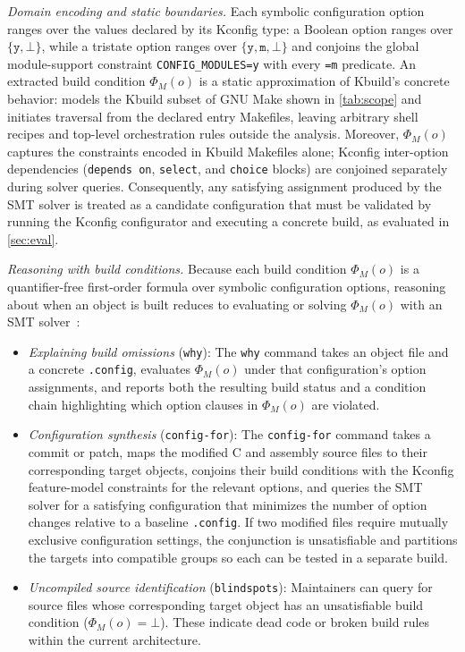 \documentclass[acmsmall,screen,review,anonymous,nonacm]{acmart}
\begin{document}
  \emph{Domain encoding and static boundaries.}
  Each symbolic configuration option ranges over the values declared by its Kconfig type: a Boolean option ranges over $\{\mathtt{y}, \bot\}$, while a tristate option ranges over $\{\mathtt{y}, \mathtt{m}, \bot\}$ and conjoins the global module-support constraint \texttt{CONFIG\_MODULES=y} with every \texttt{=m} predicate.
  An extracted build condition $\Phi_M(o)$ is a static approximation of Kbuild's concrete behavior: \tool{} models the Kbuild subset of GNU Make shown in \autoref{tab:scope} and initiates traversal from the declared entry Makefiles, leaving arbitrary shell recipes and top-level orchestration rules outside the analysis.
  Moreover, $\Phi_M(o)$ captures the constraints encoded in Kbuild Makefiles alone; Kconfig inter-option dependencies (\texttt{depends on}, \texttt{select}, and \texttt{choice} blocks) are conjoined separately during solver queries.
  Consequently, any satisfying assignment produced by the SMT solver is treated as a candidate configuration that must be validated by running the Kconfig configurator and executing a concrete build, as evaluated in \autoref{sec:eval}.

  \emph{Reasoning with build conditions.}
  Because each build condition $\Phi_M(o)$ is a quantifier-free first-order formula over symbolic configuration options, reasoning about when an object is built reduces to evaluating or solving $\Phi_M(o)$ with an SMT solver~\cite{nguyen2020kbuild}:
  \begin{itemize}[leftmargin=1.5em]
    \item \emph{Explaining build omissions} (\texttt{why}): The \texttt{why} command takes an object file and a concrete \texttt{.config}, evaluates $\Phi_M(o)$ under that configuration's option assignments, and reports both the resulting build status and a condition chain highlighting which option clauses in $\Phi_M(o)$ are violated.
    \item \emph{Configuration synthesis} (\texttt{config-for}): The \texttt{config-for} command takes a commit or patch, maps the modified C and assembly source files to their corresponding target objects, conjoins their build conditions with the Kconfig feature-model constraints for the relevant options, and queries the SMT solver for a satisfying configuration that minimizes the number of option changes relative to a baseline \texttt{.config}. If two modified files require mutually exclusive configuration settings, the conjunction is unsatisfiable and \tool{} partitions the targets into compatible groups so each can be tested in a separate build.
    \item \emph{Uncompiled source identification} (\texttt{blindspots}): Maintainers can query for source files whose corresponding target object has an unsatisfiable build condition ($\Phi_M(o) = \bot$). These indicate dead code or broken build rules within the current architecture.
  \end{itemize}
\end{document}
